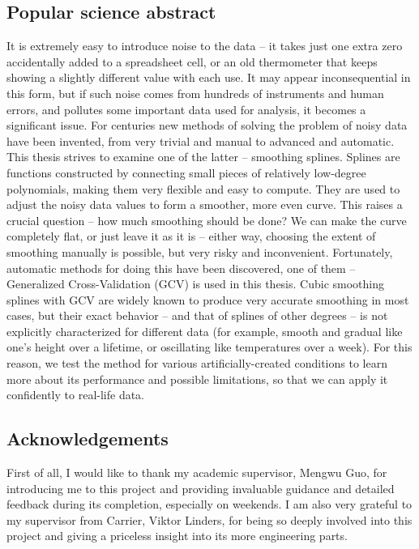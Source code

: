 \documentclass[11pt,leqno]{book}
\theoremstyle{definition}
\theoremstyle{plain}
\theoremstyle{definition}
\begin{document}
{\begin{center}
\section*{Popular science abstract}
\end{center}
It is extremely easy to introduce noise to the data -- it takes just one extra zero accidentally added to a spreadsheet cell, or an old thermometer that keeps showing a slightly different value with each use. It may appear inconsequential in this form, but if such noise comes from hundreds of instruments and human errors, and pollutes some important data used for analysis, it becomes a significant issue. For centuries new methods of solving the problem of noisy data have been invented, from very trivial and manual to advanced and automatic. This thesis strives to examine one of the latter -- smoothing splines. Splines are functions constructed by connecting small pieces of relatively low-degree polynomials, making them very flexible and easy to compute. They are used to adjust the noisy data values to form a smoother, more even curve. This raises a crucial question -- how much smoothing should be done? We can make the curve completely flat, or just leave it as it is -- either way, choosing the extent of smoothing manually is possible, but very risky and inconvenient. Fortunately, automatic methods for doing this have been discovered, one of them -- Generalized Cross-Validation (GCV) is used in this thesis. Cubic smoothing splines with GCV are widely known to produce very accurate smoothing in most cases, but their exact behavior -- and that of splines of other degrees -- is not explicitly characterized for different data (for example, smooth and gradual like one's height over a lifetime, or oscillating like temperatures over a week). For this reason, we test the method for various artificially-created conditions to learn more about its performance and possible limitations, so that we can apply it confidently to real-life data. 
\newpage
\vspace*{4cm}
\begin{center}
\section*{Acknowledgements}
\end{center}
First of all, I would like to thank my academic supervisor, Mengwu Guo, for introducing me to this project and providing invaluable guidance and detailed feedback during its completion, especially on weekends. I am also very grateful to my supervisor from Carrier, Viktor Linders, for being so deeply involved into this project and giving a priceless insight into its more engineering parts. 

}
\end{document}
